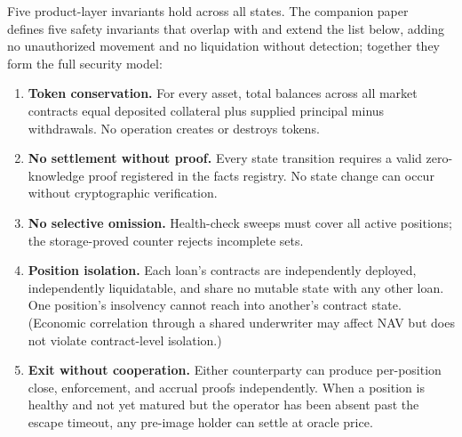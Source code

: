 Five product-layer invariants hold across all states. The companion paper~\cite{daloc-decent2026} defines five safety invariants that overlap with and extend the list below, adding no unauthorized movement and no liquidation without detection; together they form the full security model:
\begin{enumerate}
  \item \textbf{Token conservation.} For every asset, total balances across all market contracts equal deposited collateral plus supplied principal minus withdrawals. No operation creates or destroys tokens.
  \item \textbf{No settlement without proof.} Every state transition requires a valid zero-knowledge proof registered in the facts registry. No state change can occur without cryptographic verification.
  \item \textbf{No selective omission.} Health-check sweeps must cover all active positions; the storage-proved counter rejects incomplete sets.
  \item \textbf{Position isolation.} Each loan's contracts are independently deployed, independently liquidatable, and share no mutable state with any other loan. One position's insolvency cannot reach into another's contract state. (Economic correlation through a shared underwriter may affect NAV but does not violate contract-level isolation.)
  \item \textbf{Exit without cooperation.} Either counterparty can produce per-position close, enforcement, and accrual proofs independently. When a position is healthy and not yet matured but the operator has been absent past the escape timeout, any pre-image holder can settle at oracle price.
\end{enumerate}

